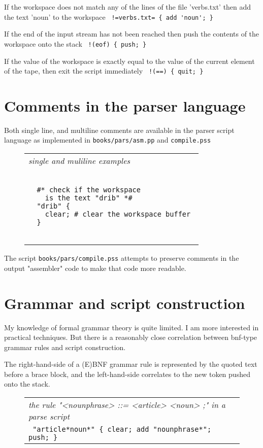 \documentclass[a4paper,12pt]{article}
\begin{document}
 If the workspace does not match any of the lines of
 the file 'verbs.txt' then add the text 'noun' to
 the workspace 
 \verb| !=verbs.txt= { add 'noun'; } |


 If the end of the input stream has not been reached
 then push the contents of the workspace onto the
 stack 
 \verb| !(eof) { push; }  |

 
 If the value of the workspace is exactly equal to the
 value of the current element of the tape, then exit
 the script immediately 
 \verb| !(==) { quit; }  |


\section{Comments in the parser language}

 Both single line, and multiline comments are available in the
 parser script language as implemented in \texttt{books/pars/asm.pp} and
 \texttt{compile.pss}
 \begin{figure}
 \begin{tabular}{ l }
 \emph{ single and muliline examples } \\ 
 \begin{lstlisting}[breaklines] 
 
  #* check if the workspace 
    is the text "drib" *#
  "drib" {
    clear; # clear the workspace buffer 
  }
 
 \end{lstlisting} 
 \end{tabular} 

 \end{figure}

The script \texttt{books/pars/compile.pss} attempts to preserve comments
in the output "assembler" code to make that code more readable.

\section{Grammar and script construction}

  My knowledge of formal grammar theory is quite limited. I am more
  interested in practical techniques. But there is a reasonably close
  correlation between bnf-type grammar rules and script construction.
  
  The right-hand-side of a (E)BNF grammar rule is represented by the
  quoted text before a brace block, and the left-hand-side
  correlates to the new token pushed onto the stack.
 \begin{figure}
 \begin{tabular}{ l }
 \emph{ the rule "<nounphrase> ::= <article> <noun> ;" in a parse script } \\ 
 \verb| "article*noun*" { clear; add "nounphrase*"; push; } |
 \end{tabular} 
 \end{figure}
\end{document}
